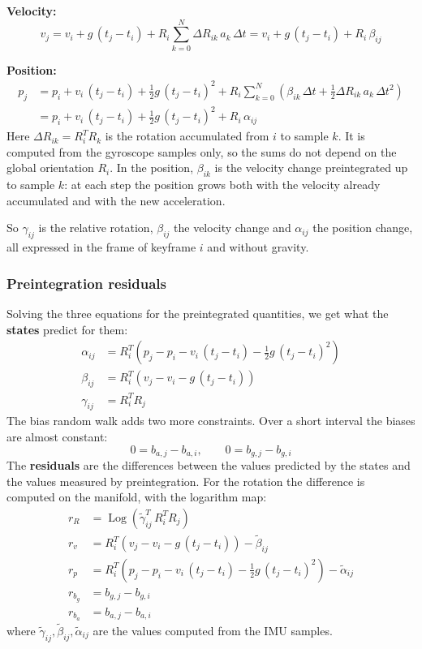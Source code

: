 \textbf{Velocity:}
\[
v_j = v_i + g\,(t_j - t_i) + R_i \sum_{k=0}^{N} \Delta R_{ik}\, a_k\, \Delta t = v_i + g\,(t_j - t_i) + R_i\, \beta_{ij}
\]

\textbf{Position:}
\[
\begin{aligned}
p_j &= p_i + v_i\,(t_j - t_i) + \frac{1}{2} g\,(t_j - t_i)^2 + R_i \sum_{k=0}^{N} \left(\beta_{ik}\, \Delta t + \frac{1}{2} \Delta R_{ik}\, a_k\, \Delta t^2\right)\\
&= p_i + v_i\,(t_j - t_i) + \frac{1}{2} g\,(t_j - t_i)^2 + R_i\, \alpha_{ij}
\end{aligned}
\]
Here $\Delta R_{ik} = R_i^T R_k$ is the rotation accumulated from $i$ to sample $k$. It is computed from the gyroscope samples only, so the sums do not depend on the global orientation $R_i$. In the position, $\beta_{ik}$ is the velocity change preintegrated up to sample $k$: at each step the position grows both with the velocity already accumulated and with the new acceleration.

So $\gamma_{ij}$ is the relative rotation, $\beta_{ij}$ the velocity change and $\alpha_{ij}$ the position change, all expressed in the frame of keyframe $i$ and without gravity.

\subsubsection{Preintegration residuals}
Solving the three equations for the preintegrated quantities, we get what the \textbf{states} predict for them:
\[
\begin{aligned}
\alpha_{ij} &= R_i^T \left(p_j - p_i - v_i\,(t_j - t_i) - \frac{1}{2} g\,(t_j - t_i)^2\right)\\
\beta_{ij} &= R_i^T \left(v_j - v_i - g\,(t_j - t_i)\right)\\
\gamma_{ij} &= R_i^T R_j
\end{aligned}
\]
The bias random walk adds two more constraints. Over a short interval the biases are almost constant:
\[
0 = b_{a,j} - b_{a,i}, \qquad 0 = b_{g,j} - b_{g,i}
\]
The \textbf{residuals} are the differences between the values predicted by the states and the values measured by preintegration. For the rotation the difference is computed on the manifold, with the logarithm map:
\[
\begin{aligned}
r_R &= \operatorname{Log}\!\left(\tilde\gamma_{ij}^T\, R_i^T R_j\right)\\
r_v &= R_i^T \left(v_j - v_i - g\,(t_j - t_i)\right) - \tilde\beta_{ij}\\
r_p &= R_i^T \left(p_j - p_i - v_i\,(t_j - t_i) - \tfrac{1}{2} g\,(t_j - t_i)^2\right) - \tilde\alpha_{ij}\\
r_{b_g} &= b_{g,j} - b_{g,i}\\
r_{b_a} &= b_{a,j} - b_{a,i}
\end{aligned}
\]
where $\tilde\gamma_{ij}, \tilde\beta_{ij}, \tilde\alpha_{ij}$ are the values computed from the IMU samples.

